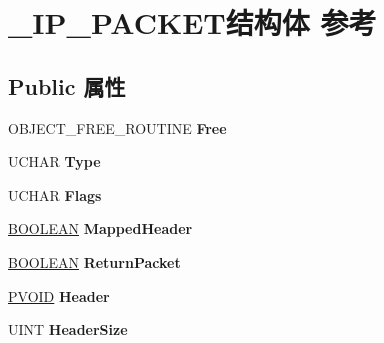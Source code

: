 \hypertarget{struct___i_p___p_a_c_k_e_t}{}\section{\+\_\+\+I\+P\+\_\+\+P\+A\+C\+K\+E\+T结构体 参考}
\label{struct___i_p___p_a_c_k_e_t}
\subsection*{Public 属性}
\begin{DoxyCompactItemize}
\item 
\mbox{\label{struct___i_p___p_a_c_k_e_t_a2bd54a01e7bf913a5934bcfe4ce9a535}} 
O\+B\+J\+E\+C\+T\+\_\+\+F\+R\+E\+E\+\_\+\+R\+O\+U\+T\+I\+NE {\bfseries Free}
\item 
\mbox{\label{struct___i_p___p_a_c_k_e_t_a2e0d872c9033791f66e18a3ffae901b6}} 
U\+C\+H\+AR {\bfseries Type}
\item 
\mbox{\label{struct___i_p___p_a_c_k_e_t_a1dbdbbc0bf3c17833234e0a5f330f48b}} 
U\+C\+H\+AR {\bfseries Flags}
\item 
\mbox{\label{struct___i_p___p_a_c_k_e_t_a79fd791289f16f68e87a7764a8d68c44}} 
\hyperlink{_processor_bind_8h_a112e3146cb38b6ee95e64d85842e380a}{B\+O\+O\+L\+E\+AN} {\bfseries Mapped\+Header}
\item 
\mbox{\label{struct___i_p___p_a_c_k_e_t_a721c44c1519e0b0758bf02aa73625d4d}} 
\hyperlink{_processor_bind_8h_a112e3146cb38b6ee95e64d85842e380a}{B\+O\+O\+L\+E\+AN} {\bfseries Return\+Packet}
\item 
\mbox{\label{struct___i_p___p_a_c_k_e_t_aa9d2ae3a6940dd85c92f43039d2c7d4e}} 
\hyperlink{interfacevoid}{P\+V\+O\+ID} {\bfseries Header}
\item 
\mbox{\label{struct___i_p___p_a_c_k_e_t_a9e703bb23e5bd0b20526f6293ec4d50f}} 
U\+I\+NT {\bfseries Header\+Size}
\item 
\mbox{\label{struct___i_p___p_a_c_k_e_t_a10225142854f0f455abaf353f694ee66}} 

\end{DoxyCompactItemize}
